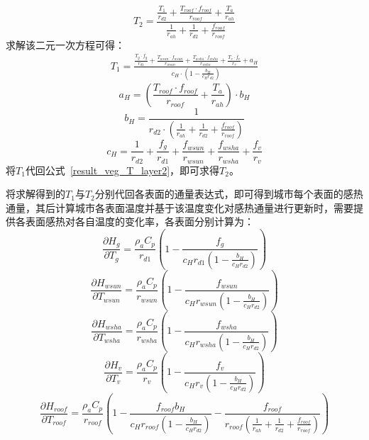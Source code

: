 %
\begin{equation}\label{result_veg_T_layer2}
    T_{2} = \frac{\frac{T_{1}}{r_{d2}} + \frac{T_{roof} \cdot f_{roof}}{r_{roof}} + \frac{T_a}{r_{ah}}}{\frac{1}{r_{ah}} + \frac{1}{r_{d2}} + \frac{f_{roof}}{r_{roof}}}
\end{equation}
求解该二元一次方程可得：
\begin{equation}
    \begin{split}
         T_{1} = 
         \frac{\frac{T_{g} \cdot f_{g}}{r_{d1}} + \frac{T_{wsun} \cdot f_{wsun}}{r_{wsun}} + \frac{T_{wsha} \cdot f_{wsha}}{r_{wsha}} + \frac{T_{v} \cdot f_{v}}{r_{v}} + a_{H}}{c_{H} \cdot \left( 1 - \frac{b_H}{c_{H} r_{d2}} \right)}
    \end{split}
\end{equation}
%
\begin{equation}
    a_{H} = \left(\frac{T_{roof} \cdot f_{roof}}{r_{roof}} + \frac{T_a}{r_{ah}}\right) \cdot b_{H}
\end{equation}
%
\begin{equation}
    b_{H} = \frac{1}{r_{d2} \cdot \left(\frac{1}{r_{ah}} + \frac{1}{r_{d2}} + \frac{f_{roof}}{r_{roof}} \right)}
\end{equation}
%
\begin{equation}
    c_{H} = \frac{1}{r_{d2}} + \frac{f_{g}}{r_{d1}} + \frac{f_{wsun}}{r_{wsun}} + \frac{f_{wsha}}{r_{wsha}} + \frac{f_v}{r_{v}}
\end{equation}
将$T_{1}$代回公式~\eqref{result_veg_T_layer2}，即可求得$T_{2}$。

将求解得到的$T_{1}$与$T_{2}$分别代回各表面的通量表达式，即可得到城市每个表面的感热通量，其后计算城市各表面温度并基于该温度变化对感热通量进行更新时，需要提供各表面感热对各自温度的变化率，各表面分别计算为：
\begin{equation}
\frac{\partial H_{g}}{\partial T_{g}} = \frac{\rho _a C_p}{r_{d1}} \left(1-\frac{f_g}{c_{H} r_{d1} \left(1-\frac{b_H}{c_{H} r_{d2}}\right)}\right)
\end{equation}
%
\begin{equation}
\frac{\partial H_{wsun}}{\partial T_{wsun}} = \frac{\rho _a C_p}{r_{wsun}} \left(1-\frac{f_{wsun}}{c_{H} r_{wsun} \left(1-\frac{b_H}{c_{H} r_{d2}}\right)}\right)
\end{equation}
%
\begin{equation}
\frac{\partial H_{wsha}}{\partial T_{wsha}} = \frac{\rho _a C_p}{r_{wsha}} \left(1-\frac{f_{wsha}}{c_{H} r_{wsha} \left(1-\frac{b_H}{c_{H} r_{d2}}\right)}\right)
\end{equation}
%
\begin{equation}
\frac{\partial H_{v}}{\partial T_{v}} = \frac{\rho _a C_p}{r_{v}} \left(1-\frac{f_{v}}{c_{H} r_{v} \left(1-\frac{b_H}{c_{H} r_{d2}}\right)}\right)
\end{equation}
%
\begin{equation}
\frac{\partial H_{roof}}{\partial T_{roof}} = \frac{\rho _a C_p}{r_{roof}} \left(1-\frac{f_{roof} b_{H}}{c_{H} r_{roof} \left(1-\frac{b_H}{c_{H} r_{d2}}\right)}-\frac{f_{roof}}{r_{roof}\left(\frac{1}{r_{ah}}+\frac{1}{r_{d2}}+\frac{f_{roof}}{r_{roof}}\right)}\right)
\end{equation}

